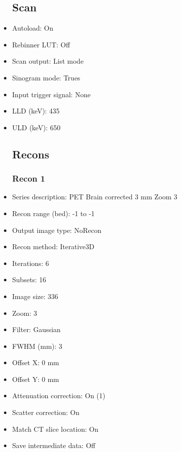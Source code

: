 \documentclass[12pt]{article}
\begin{document}
\begin{itemize}
\subsection{Scan}
\item Autoload: On
\item Rebinner LUT: Off
\item Scan output: List mode
\item Sinogram mode: Trues
\item Input trigger signal: None
\item LLD (keV): 435
\item ULD (keV): 650
\subsection{Recons}
\subsubsection{Recon 1}
\item Series description: PET Brain corrected 3 mm Zoom 3
\item Recon range (bed): -1 to -1
\item Output image type: NoRecon
\item Recon method: Iterative3D
\item Iterations: 6
\item Subsets: 16
\item Image size: 336
\item Zoom: 3
\item Filter: Gaussian
\item FWHM (mm): 3
\item Offset X: 0 mm
\item Offset Y: 0 mm
\item Attenuation correction: On (1)
\item Scatter correction: On
\item Match CT slice location: On
\item Save intermediate data: Off
\end{itemize}
\end{document}
